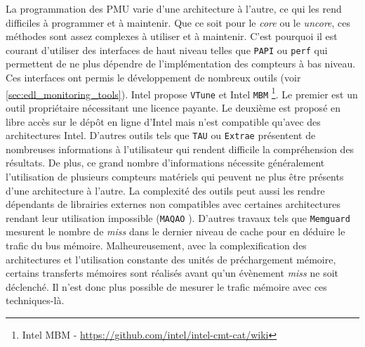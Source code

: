         La programmation des PMU varie d'une architecture à l'autre, ce qui les rend difficiles à programmer et à maintenir. Que ce soit pour le \textit{core} ou le \textit{uncore}, ces méthodes sont assez complexes à utiliser et à maintenir. C'est pourquoi il est courant d'utiliser des interfaces de haut niveau telles que \texttt{PAPI} \cite{Browne2000} ou \texttt{perf} qui permettent de ne plus dépendre de l'implémentation des compteurs à bas niveau. 
        Ces interfaces ont permis le développement de nombreux outils (voir \autoref{sec:edl_monitoring_tools}). Intel propose \verb|VTune| \cite{reinders2005vtune} et Intel \verb=MBM= \footnote{Intel MBM - \url{https://github.com/intel/intel-cmt-cat/wiki}}. Le premier est un outil propriétaire nécessitant une licence payante. Le deuxième est proposé en libre accès sur le dépôt en ligne d'Intel mais n'est compatible qu'avec des architectures Intel.
        D'autres outils tels que \verb=TAU= \cite{Lindlan2000} ou \verb=Extrae= \cite{Rodriguez} présentent de nombreuses informations à l'utilisateur qui rendent difficile la compréhension des résultats. De plus, ce grand nombre d'informations nécessite généralement l'utilisation de plusieurs compteurs matériels qui peuvent ne plus être présents d'une architecture à l'autre. La complexité des outils peut aussi les rendre dépendants de librairies externes non compatibles avec certaines architectures rendant leur utilisation impossible (\verb|MAQAO| \cite{Djoudi2005}). 
        D'autres travaux tels que \verb=Memguard= \cite{Yun2013} mesurent le nombre de \textit{\gls{miss}} dans le dernier niveau de cache pour en déduire le trafic du bus mémoire. Malheureusement, avec la complexification des architectures et l'utilisation constante des unités de préchargement mémoire, certains transferts mémoires sont réalisés avant qu'un évènement \textit{\gls{miss}} ne soit déclenché. Il n'est donc plus possible de mesurer le trafic mémoire avec ces techniques-là. 
        
        
   

